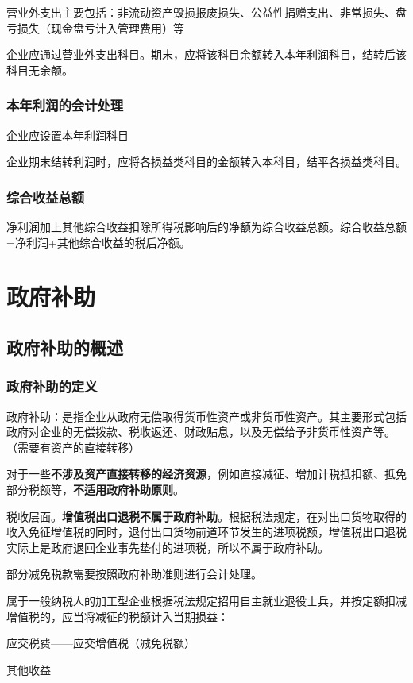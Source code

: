 \documentclass[UTF8,12pt]{ctexart}
\newenvironment{Dr}{%
	\begin{list}{}%
		{
			\setlength{\leftmargin}{2em}
			\setlength{\labelwidth}{2em}
			\setlength{\labelsep}{0pt}
			\setlength{\itemindent}{0pt}
			\setlength{\listparindent}{0pt}
			\setlength{\parsep}{0pt}
			\setlength{\topsep}{0pt}
		}
		\item[\textbf{借：}]
	}{%
	\end{list}
}
\newenvironment{Cr}{%
	\begin{list}{}%
		{
			\setlength{\leftmargin}{3em}
			\setlength{\labelwidth}{2em}
			\setlength{\labelsep}{0pt}
			\setlength{\itemindent}{0pt}
			\setlength{\listparindent}{0pt}
			\setlength{\parsep}{0pt}
			\setlength{\topsep}{0pt}
		}
		\item[\textbf{贷：}]
	}{%
	\end{list}
}
\numberwithin{equation}{section} %
\numberwithin{figure}{section}
\numberwithin{table}{section}
\begin{document}
	营业外支出主要包括：非流动资产毁损报废损失、公益性捐赠支出、非常损失、盘亏损失（现金盘亏计入管理费用）等
	
	企业应通过营业外支出科目。期末，应将该科目余额转入本年利润科目，结转后该科目无余额。
	\subsubsection{本年利润的会计处理}
	企业应设置本年利润科目
	
	企业期末结转利润时，应将各损益类科目的金额转入本科目，结平各损益类科目。
	\subsubsection{综合收益总额}
	净利润加上其他综合收益扣除所得税影响后的净额为综合收益总额。综合收益总额=净利润+其他综合收益的税后净额。
	
	
	\newpage
	\section{政府补助}
	\subsection{政府补助的概述}
	\subsubsection{政府补助的定义}
	政府补助：是指企业从政府无偿取得货币性资产或非货币性资产。其主要形式包括政府对企业的无偿拨款、税收返还、财政贴息，以及无偿给予非货币性资产等。（需要有资产的直接转移）
	
	对于一些\textbf{不涉及资产直接转移的经济资源}，例如直接减征、增加计税抵扣额、抵免部分税额等，\textbf{不适用政府补助原则}。
	
	税收层面。\textbf{增值税出口退税不属于政府补助}。根据税法规定，在对出口货物取得的收入免征增值税的同时，退付出口货物前道环节发生的进项税额，增值税出口退税实际上是政府退回企业事先垫付的进项税，所以不属于政府补助。
	
	部分减免税款需要按照政府补助准则进行会计处理。
	
 	属于一般纳税人的加工型企业根据税法规定招用自主就业退役士兵，并按定额扣减增值税的，应当将减征的税额计入当期损益：
 	\begin{Dr}
 		应交税费——应交增值税（减免税额）
 	\end{Dr}
 	\begin{Cr}
 		其他收益
 	\end{Cr}
	
\end{document}
